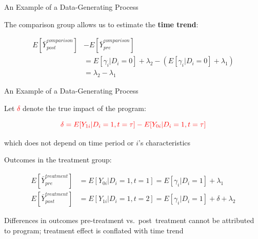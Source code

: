\documentclass[10pt,xcolor=table,ignorenonframetext,handout,aspectratio=169]{beamer}
\begin{document}
\begin{frame}{An Example of a Data-Generating Process}

\medskip
The comparison group allows us to estimate the \textbf{time trend}:

\medskip

\begin{small}
	\begingroup
	\addtolength{\jot}{1em}
	\begin{align*}
	E [ \bar{Y}^{comparison}_{post} ] &- E [ \bar{Y}^{comparison}_{pre} ] \\
	&= E [ \gamma_i \vert D_i = 0 ] + \lambda_2 - \left( E [ \gamma_i \vert D_i = 0 ] + \lambda_1 \right) \\
	&= \lambda_2 - \lambda_1
	\end{align*}
	\endgroup
\end{small}

\end{frame}




\begin{frame}{An Example of a Data-Generating Process}



\medskip
Let \textcolor{red}{$\delta$} denote the true impact of the program:
\begin{small}
	\begin{equation*}
	\textcolor{red}{\delta = E [ Y_{1i} \vert D_i = 1, t = \tau  ] - E [ Y_{0i} \vert D_i = 1, t = \tau  ] }
	\end{equation*}
\end{small}

\vspace{-0.5cm}

which does not depend on time period or $i$'s characteristics

\pause
\medskip
\medskip
Outcomes in the treatment group:
\begin{small}
	\begingroup
	\addtolength{\jot}{1em}
	\begin{align*}
	E [ \bar{Y}^{treatment}_{pre} ] &= E [ Y_{0i} \vert D_i = 1, t=1 ] = E [ \gamma_i \vert D_i = 1 ] + \lambda_1 \\
	E [ \bar{Y}^{treatment}_{post} ] &= E [ Y_{1i} \vert D_i = 1, t=2 ] = E [ \gamma_i \vert D_i = 1 ] + \delta + \lambda_2
	\end{align*}
	\endgroup
\end{small}

\pause
Differences in outcomes pre-treatment vs.~post~treatment cannot be attributed to program; treatment effect is conflated with time trend


\end{frame}
\end{document}
